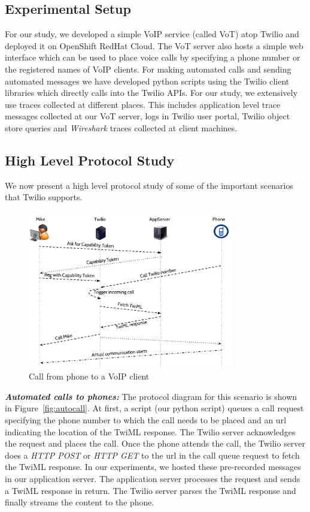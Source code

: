 \subsection{Experimental Setup}

For our study, we developed a simple VoIP service (called VoT) atop Twilio and deployed it on OpenShift RedHat Cloud. The VoT server also hosts a simple web interface which can be used to place voice calls by specifying a phone number or the registered names of VoIP clients. For making automated calls and sending automated messages we have developed python scripts using the Twilio client libraries which directly calls into the Twilio APIs. For our study, we extensively use traces collected at different places. This includes application level trace messages collected at our VoT server, logs in Twilio user portal, Twilio object store queries and \textit{Wireshark} traces collected at client machines.

\subsection{High Level Protocol Study}
\label{subsec-protostudy}
We now present a high level protocol study of some of the important scenarios that Twilio supports. 

 
\begin{figure}[t!] 
\centering
  \includegraphics[width=0.8\textwidth]{figs/p2c.pdf}
\caption{Call from phone to a VoIP client}
\label{fig:callfromphone}
\end{figure}

\emph{\textbf{Automated calls to phones:} }
The protocol diagram for this scenario is shown in  Figure~\ref{fig:autocall}. At first, a script (our python script) queues a call request specifying the phone number to which the call needs to be placed and an url indicating the location of the TwiML response. The Twilio server acknowledges the request and places the call. Once the phone attends the call, the Twilio server does a \textit{HTTP POST} or \textit{HTTP GET} to the url in the call queue request to fetch the TwiML response. In our experiments, we hosted these pre-recorded messages in our application server. The application server processes the request and sends a TwiML response in return. The Twilio server parses the TwiML response and finally streams the content to the phone.  

